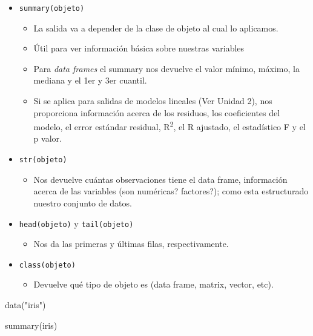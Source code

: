 \documentclass[
]{book}
\newenvironment{Shaded}{\begin{snugshade}}{\end{snugshade}}
\newcommand{\FunctionTok}[1]{\textcolor[rgb]{0.00,0.00,0.00}{#1}}
\newcommand{\NormalTok}[1]{#1}
\newcommand{\StringTok}[1]{\textcolor[rgb]{0.31,0.60,0.02}{#1}}
\providecommand{\tightlist}{%
  \setlength{\itemsep}{0pt}\setlength{\parskip}{0pt}}
\begin{document}
\begin{itemize}
\tightlist
\item
  \texttt{summary(objeto)}

  \begin{itemize}
  \tightlist
  \item
    La salida va a depender de la clase de objeto al cual lo aplicamos.
  \item
    Útil para ver información básica sobre nuestras variables
  \item
    Para \emph{data frames} el summary nos devuelve el valor mínimo, máximo, la mediana y el 1er y 3er cuantil.
  \item
    Si se aplica para salidas de modelos lineales (Ver Unidad 2), nos proporciona información acerca de los residuos, los coeficientes del modelo, el error estándar residual, R\textsuperscript{2}, el R ajustado, el estadístico F y el p valor.
  \end{itemize}
\item
  \texttt{str(objeto)}

  \begin{itemize}
  \tightlist
  \item
    Nos devuelve cuántas observaciones tiene el data frame, información acerca de las variables (son numéricas? factores?); como esta estructurado nuestro conjunto de datos.
  \end{itemize}
\item
  \texttt{head(objeto)} y \texttt{tail(objeto)}

  \begin{itemize}
  \tightlist
  \item
    Nos da las primeras y últimas filas, respectivamente.
  \end{itemize}
\item
  \texttt{class(objeto)}

  \begin{itemize}
  \tightlist
  \item
    Devuelve qué tipo de objeto es (data frame, matrix, vector, etc).
  \end{itemize}
\end{itemize}

\begin{Shaded}
\begin{Highlighting}[]
\FunctionTok{data}\NormalTok{(}\StringTok{"iris"}\NormalTok{)}

\FunctionTok{summary}\NormalTok{(iris)}
\end{Highlighting}
\end{Shaded}
\end{document}
